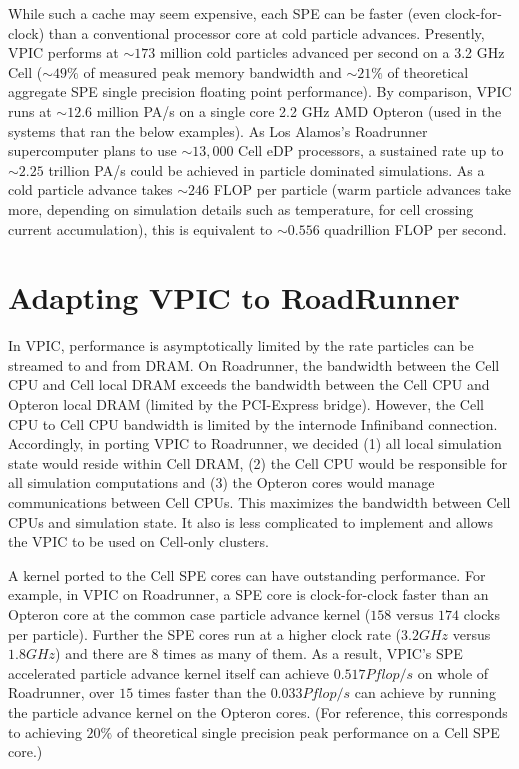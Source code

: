 \documentclass[letter,10pt]{article}
\begin{document}
While such a cache may seem expensive, each SPE can be faster (even
clock-for-clock) than a conventional processor core at cold particle
advances.  Presently, VPIC performs at $\sim 173$ million cold
particles advanced per second on a 3.2 GHz Cell ($\sim 49\%$ of
measured peak memory bandwidth and $\sim 21\%$ of theoretical
aggregate SPE single precision floating point performance).  By
comparison, VPIC runs at $\sim 12.6$ million PA/s on a single core 2.2
GHz AMD Opteron (used in the systems that ran the below examples).  As
Los Alamos's Roadrunner supercomputer plans to use $\sim 13,000$ Cell
eDP processors, a sustained rate up to $\sim 2.25$ trillion PA/s could
be achieved in particle dominated simulations.  As a cold particle
advance takes $\sim 246$ FLOP per particle (warm particle advances
take more, depending on simulation details such as temperature, for
cell crossing current accumulation), this is equivalent to $\sim
0.556$ quadrillion FLOP per second.

\section*{Adapting VPIC to RoadRunner}

In VPIC, performance is asymptotically limited by the rate particles
can be streamed to and from DRAM.  On Roadrunner, the bandwidth
between the Cell CPU and Cell local DRAM exceeds the bandwidth between
the Cell CPU and Opteron local DRAM (limited by the PCI-Express
bridge).  However, the Cell CPU to Cell CPU bandwidth is limited by
the internode Infiniband connection.  Accordingly, in porting VPIC to
Roadrunner, we decided (1) all local simulation state would reside
within Cell DRAM, (2) the Cell CPU would be responsible for all
simulation computations and (3) the Opteron cores would manage
communications between Cell CPUs.  This maximizes the bandwidth
between Cell CPUs and simulation state.  It also is less complicated
to implement and allows the VPIC to be used on Cell-only clusters.


A kernel ported to the Cell SPE cores can have outstanding
performance.  For example, in VPIC on Roadrunner, a SPE core is
clock-for-clock faster than an Opteron core at the common case
particle advance kernel ($158$ versus $174$ clocks per particle).
Further the SPE cores run at a higher clock rate ($3.2 GHz$ versus
$1.8 GHz$) and there are $8$ times as many of them.  As a result,
VPIC's SPE accelerated particle advance kernel itself can achieve
$0.517 Pflop/s$ on whole of Roadrunner, over $15$ times faster than
the $0.033 Pflop/s$ can achieve by running the particle advance kernel
on the Opteron cores.  (For reference, this corresponds to achieving
$20\%$ of theoretical single precision peak performance on a Cell SPE
core.)
\end{document}
